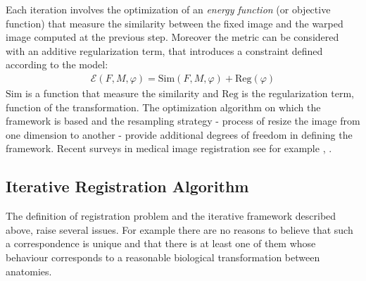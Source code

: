 Each iteration involves the optimization of an \emph{energy function}  (or objective function) that measure the similarity between the fixed image and the warped image computed at the previous step. Moreover the metric can be considered with an additive regularization term, that introduces a constraint defined according to the model:
\begin{align}\label{eq:general_cost_function}
\mathcal{E}(F, M, \varphi) = \text{Sim}(F,M,\varphi) + \text{Reg}(\varphi) 
\end{align}
$\text{Sim}$ is a function that measure the similarity and $\text{Reg}$ is the regularization term, function of the transformation.
The optimization algorithm on which the framework is based and the resampling strategy - process of resize the image from one dimension to another - provide additional degrees of freedom in defining the framework.
Recent surveys in medical image registration see for example \cite{Sotiras:survey:13}, \cite{zitova2003image}. 

\subsection{Iterative Registration Algorithm}

The definition of registration problem and the iterative framework described above, raise several issues. For example there are no reasons to believe that such a correspondence is unique and that there is at least one of them whose behaviour corresponds to a reasonable biological transformation between anatomies.

